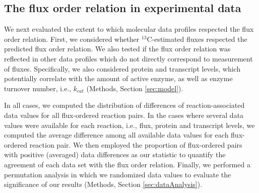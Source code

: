 \documentclass[12pt]{article}
\begin{document}
\subsection{The flux order relation in experimental data}
We next evaluated the extent to which molecular data profiles respected the flux order relation. First, we considered whether ${}^{13}\mathrm{C}$-estimated fluxes respected the predicted flux order relation. We also tested if the flux order relation was reflected in other data profiles which do not directly correspond to measurement of fluxes. Specifically, we also considered protein and transcript levels, which potentially correlate with the amount of active enzyme, as well as enzyme turnover number, i.e., $k_{cat}$ (Methods, Section \ref{sec:model}).

In all cases, we computed the distribution of differences of reaction-associated data values for all flux-ordered reaction pairs. In the cases where several data values were available for each reaction, i.e., flux, protein and transcript levels, we computed the average difference among all available data values for each flux-ordered reaction pair. We then employed the proportion of flux-ordered pairs with positive (averaged) data differences as our statistic to quantify the agreement of each data set with the flux order relation. Finally, we performed a permutation analysis in which we randomized data values to evaluate the significance of our results (Methods, Section \ref{sec:dataAnalysis}).
\end{document}
